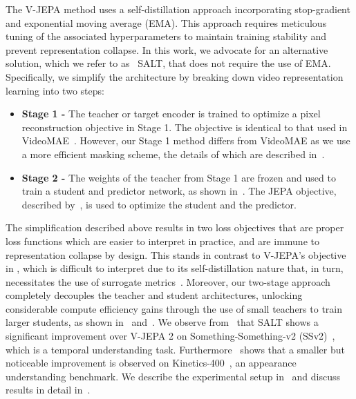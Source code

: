 \documentclass{applemlr}
\numberwithin{equation}{section}
\newcommand{\ourmethod}{SALT\xspace}
\begin{document}
The V-JEPA method uses a self-distillation approach incorporating stop-gradient and exponential moving average (EMA). This approach requires meticulous tuning of the  associated hyperparameters to maintain training stability and prevent representation collapse. In this work, we advocate for an alternative solution, which we refer to as ~\ourmethod, that does not require the use of EMA. Specifically, we simplify the architecture by breaking down video representation learning into two steps:
\begin{itemize}
    \item \textbf{Stage 1 - } The teacher or target encoder is trained to optimize a pixel reconstruction objective in Stage 1. The objective is identical to that used in VideoMAE~\citep{videomaev1_tong2022}. However, our Stage 1 method differs from VideoMAE as we use a more efficient masking scheme, the details of which are described in~.
    \item \textbf{Stage 2 - } The weights of the teacher from Stage 1 are frozen and used to train a student and predictor network, as shown in~. The JEPA objective, described by~, is used to optimize the student and the predictor.
\end{itemize}

The simplification described above results in two loss objectives that are proper loss functions which are easier to interpret in practice, and are immune to representation collapse by design. This stands in contrast to V-JEPA's objective in , which is difficult to interpret due to its self-distillation nature that, in turn, necessitates the use of surrogate metrics~\citep{rankme_garrido, lidar_thilak}. Moreover, our two-stage approach completely decouples the teacher and student architectures, unlocking considerable compute efficiency gains through the use of small teachers to train larger students, as shown in~ and~. We observe from~ that SALT shows a significant improvement over V-JEPA 2 on Something-Something-v2 (SSv2)~\citep{goyal2017something}, which is a temporal understanding task. Furthermore~ shows that a smaller but noticeable improvement is observed on Kinetics-400~\citep{kay2017kinetics}, an appearance understanding benchmark. We describe the experimental setup in~ and discuss results in detail in~.
\end{document}
